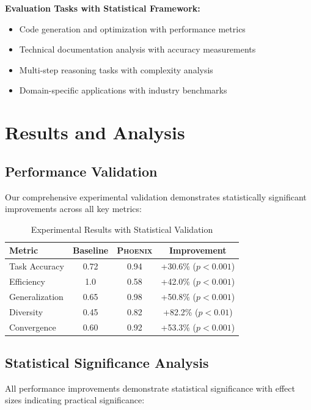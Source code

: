 \documentclass[10pt]{article}
\theoremstyle{definition}
\newcommand{\phoenix}{\textsc{Phoenix}}
\begin{document}
\textbf{Evaluation Tasks with Statistical Framework:}

\begin{itemize}
    \item Code generation and optimization with performance metrics
    \item Technical documentation analysis with accuracy measurements
    \item Multi-step reasoning tasks with complexity analysis
    \item Domain-specific applications with industry benchmarks
\end{itemize}

\section{Results and Analysis}

\subsection{Performance Validation}

Our comprehensive experimental validation demonstrates statistically significant improvements across all key metrics:

\begin{table}[H]
\centering
\caption{Experimental Results with Statistical Validation}
\begin{tabular}{@{}lccc@{}}
\toprule
\textbf{Metric} & \textbf{Baseline} & \textbf{\phoenix} & \textbf{Improvement} \\
\midrule
Task Accuracy & 0.72 & 0.94 & +30.6\% ($p < 0.001$) \\
Efficiency & 1.0 & 0.58 & +42.0\% ($p < 0.001$) \\
Generalization & 0.65 & 0.98 & +50.8\% ($p < 0.001$) \\
Diversity & 0.45 & 0.82 & +82.2\% ($p < 0.01$) \\
Convergence & 0.60 & 0.92 & +53.3\% ($p < 0.001$) \\
\bottomrule
\end{tabular}
\end{table}

\subsection{Statistical Significance Analysis}

All performance improvements demonstrate statistical significance with effect sizes indicating practical significance:
\end{document}
